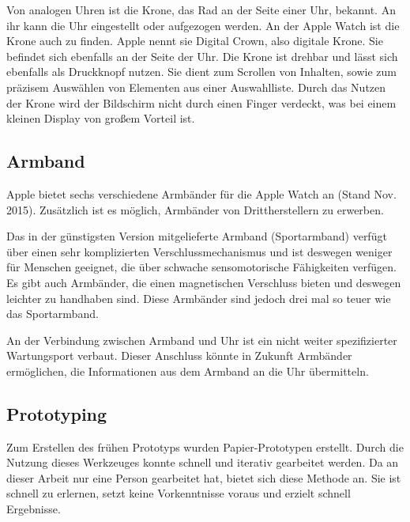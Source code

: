  Von analogen Uhren ist die Krone, das Rad an der Seite einer Uhr, bekannt. An ihr kann die Uhr eingestellt oder aufgezogen werden. An der Apple Watch ist die Krone auch zu finden. Apple nennt sie \glqq Digital Crown\grqq, also digitale Krone. Sie befindet sich ebenfalls an der Seite der Uhr. Die Krone ist drehbar und lässt sich ebenfalls als Druckknopf nutzen. Sie dient zum Scrollen von Inhalten, sowie zum präzisem Auswählen von Elementen aus einer Auswahlliste. Durch das Nutzen der Krone wird der Bildschirm nicht durch einen Finger verdeckt, was bei einem kleinen Display von großem Vorteil ist.
\subsection{Armband}
Apple bietet sechs verschiedene Armbänder für die Apple Watch an (Stand Nov. 2015). Zusätzlich ist es möglich, Armbänder von Drittherstellern zu erwerben. 

Das in der günstigsten Version mitgelieferte Armband (Sportarmband) verfügt über einen sehr komplizierten Verschlussmechanismus und ist deswegen weniger für Menschen geeignet, die über schwache sensomotorische Fähigkeiten verfügen. Es gibt auch Armbänder, die einen magnetischen Verschluss bieten und deswegen leichter zu handhaben sind. Diese Armbänder sind jedoch drei mal so teuer wie das Sportarmband.

An der Verbindung zwischen Armband und Uhr ist ein nicht weiter spezifizierter Wartungsport verbaut. Dieser Anschluss könnte in Zukunft Armbänder ermöglichen, die Informationen aus dem Armband an die Uhr übermitteln.
\subsection{Prototyping}
Zum Erstellen des frühen Prototyps wurden Papier-Prototypen erstellt. Durch die Nutzung dieses Werkzeuges konnte schnell und iterativ gearbeitet werden. Da an dieser Arbeit nur eine Person gearbeitet hat, bietet sich diese Methode an. Sie ist schnell zu erlernen, setzt keine Vorkenntnisse voraus und erzielt schnell Ergebnisse.



